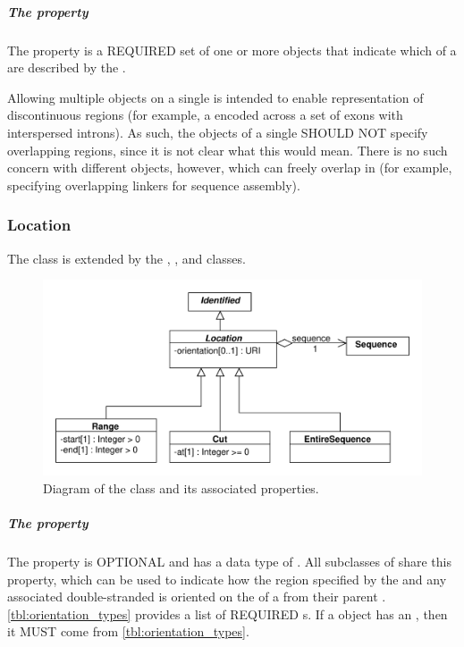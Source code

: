 \subparagraph{The  property}\label{sec:locations}
The  property is a REQUIRED set of one or more  objects that indicate which  of a  are described by the .

Allowing multiple  objects on a single  is intended to enable representation of discontinuous regions (for example, a  encoded across a set of exons with interspersed introns).
As such, the  objects of a single  SHOULD NOT specify overlapping regions, since it is not clear what this would mean.
There is no such concern with different  objects, however, which can freely overlap in  (for example, specifying overlapping linkers for sequence assembly).

\subsubsection{Location}
\label{sec:Location}
The  class is extended by the , , and  classes.

\begin{figure}[ht]
\begin{center}
\includegraphics[scale=0.6]{uml/location}
\caption[]{Diagram of the  class and its associated properties.}
\label{uml:location}
\end{center}
\end{figure} 

\subparagraph{The  property}
\label{sec:orientation}
The  property is OPTIONAL and has a data type of . All subclasses of  share this property, which can be used to indicate how the region specified by the  and any associated double-stranded  is oriented on the  of a   from their parent . \ref{tbl:orientation_types} provides a list of REQUIRED  s. If a  object has an , then it MUST come from \ref{tbl:orientation_types}.

